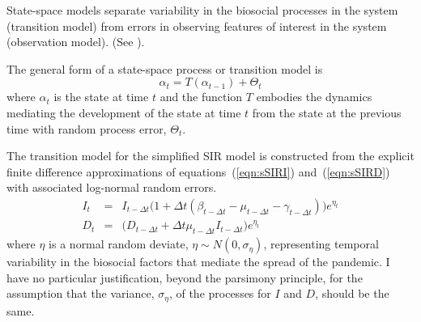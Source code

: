 \documentclass[12pt,letterpaper]{article}
\begin{document}
State-space models separate variability in the biosocial
processes in the system (transition model)
from errors in observing features of interest
in the system (observation model).
(See \cite{Harvey1990}).

The general form of a state-space process or transition model is
\begin{equation}
\alpha_t=T(\alpha_{t-1}) + \Theta_t
\end{equation}
where $\alpha_t$ is the state at time $t$ and 
the function $T$ embodies the dynamics mediating the
development of the state at time $t$ from the state at the previous
time with random process error, $\Theta_t$.

The transition model for the simplified SIR model is constructed from
the explicit finite difference
approximations of equations~(\ref{eqn:sSIRI}) and~(\ref{eqn:sSIRD}) 
with associated log-normal
random errors.
\begin{eqnarray}
\label{eqn:sSIRfdI}
I_t &=& I_{t-\Delta t}\big(1+\Delta t(\beta_{t-\Delta t} - \mu_{t-\Delta t}
- \gamma_{t-\Delta t})\big)e^{\eta_t}\\
\label{eqn:sSIRfdD}
D_t &=& \big(D_{t-\Delta t} + \Delta t \mu_{t-\Delta t}I_{t-\Delta
t}\big)e^{\eta_t}
\end{eqnarray}
where $\eta$ is a normal random deviate, $\eta\sim
N(0,\sigma_\eta)$, representing temporal variability in the biosocial
factors that mediate the spread of the pandemic. 
I have no particular justification, beyond the parsimony principle,
for the assumption that the variance, $\sigma_\eta$, of the processes
for $I$ and $D$, should be the same.
\end{document}
